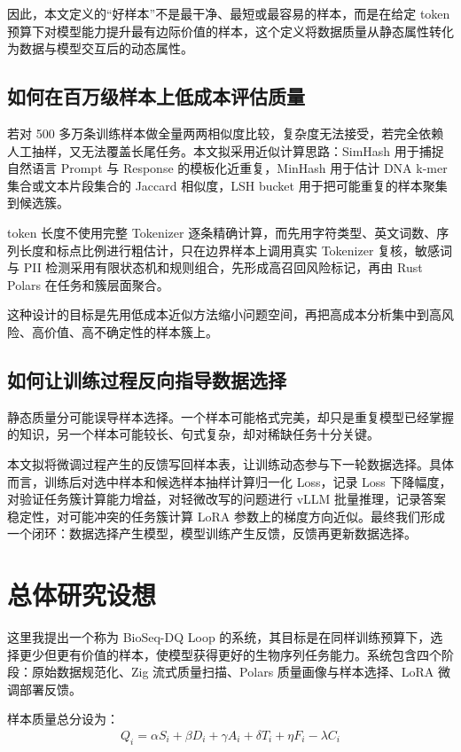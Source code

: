 \documentclass{article}
\begin{document}
因此，本文定义的“好样本”不是最干净、最短或最容易的样本，而是在给定 token 预算下对模型能力提升最有边际价值的样本，这个定义将数据质量从静态属性转化为数据与模型交互后的动态属性。



\subsection{如何在百万级样本上低成本评估质量}
若对 500 多万条训练样本做全量两两相似度比较，复杂度无法接受，若完全依赖人工抽样，又无法覆盖长尾任务。本文拟采用近似计算思路：SimHash 用于捕捉自然语言 Prompt 与 Response 的模板化近重复，MinHash 用于估计 DNA k-mer 集合或文本片段集合的 Jaccard 相似度，LSH bucket 用于把可能重复的样本聚集到候选簇。

token 长度不使用完整 Tokenizer 逐条精确计算，而先用字符类型、英文词数、序列长度和标点比例进行粗估计，只在边界样本上调用真实 Tokenizer 复核，敏感词与 PII 检测采用有限状态机和规则组合，先形成高召回风险标记，再由 Rust Polars 在任务和簇层面聚合。

这种设计的目标是先用低成本近似方法缩小问题空间，再把高成本分析集中到高风险、高价值、高不确定性的样本簇上。



\subsection{如何让训练过程反向指导数据选择}
静态质量分可能误导样本选择。一个样本可能格式完美，却只是重复模型已经掌握的知识，另一个样本可能较长、句式复杂，却对稀缺任务十分关键。

本文拟将微调过程产生的反馈写回样本表，让训练动态参与下一轮数据选择。具体而言，训练后对选中样本和候选样本抽样计算归一化 Loss，记录 Loss 下降幅度，对验证任务簇计算能力增益，对轻微改写的问题进行 vLLM 批量推理，记录答案稳定性，对可能冲突的任务簇计算 LoRA 参数上的梯度方向近似。最终我们形成一个闭环：数据选择产生模型，模型训练产生反馈，反馈再更新数据选择。



\section{总体研究设想}
这里我提出一个称为 BioSeq-DQ Loop 的系统，其目标是在同样训练预算下，选择更少但更有价值的样本，使模型获得更好的生物序列任务能力。系统包含四个阶段：原始数据规范化、Zig 流式质量扫描、Polars 质量画像与样本选择、LoRA 微调部署反馈。

样本质量总分设为：
\begin{align}
    Q_i = \alpha S_i + \beta D_i + \gamma A_i + \delta T_i + \eta F_i - \lambda C_i
\end{align}
\end{document}

